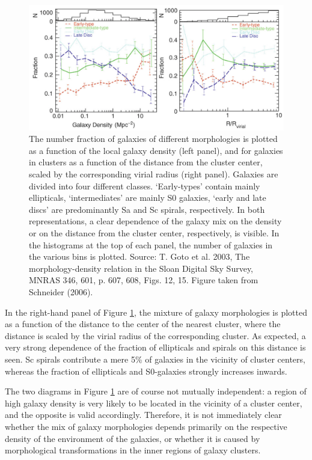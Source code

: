 \documentclass[a4paper,11pt]{article}
\begin{document}
\begin{figure}[t]
    \includegraphics[width=16cm]{figures/DensityMorphology.png}
    \centering
    \caption{\footnotesize{The number fraction of galaxies of different morphologies is plotted as a function of the local galaxy density (left panel), and for galaxies in clusters as a function of the distance from the cluster center, scaled by the corresponding virial radius (right panel). Galaxies are divided into four different classes. `Early-types' contain mainly ellipticals, `intermediates' are mainly S0 galaxies, `early and late discs' are predominantly Sa and Sc spirals, respectively. In both representations, a clear dependence of the galaxy mix on the density or on the distance from the cluster center, respectively, is visible. In the histograms at the top of each panel, the number of galaxies in the various bins is plotted. Source: T. Goto et al. 2003, The morphology-density relation in the Sloan Digital Sky Survey, MNRAS 346, 601, p. 607, 608, Figs. 12, 15. Figure taken from Schneider (2006).}}
    \label{fig:densitymorphology}
\end{figure}

{\noindent}In the right-hand panel of Figure \ref{fig:densitymorphology}, the mixture of galaxy morphologies is plotted as a function of the distance to the center of the nearest cluster, where the distance is scaled by the virial radius of the corresponding cluster. As expected, a very strong dependence of the fraction of ellipticals and spirals on this distance is seen. Sc spirals contribute a mere 5\% of galaxies in the vicinity of cluster centers, whereas the fraction of ellipticals and S0-galaxies strongly increases inwards.

{\noindent}The two diagrams in Figure \ref{fig:densitymorphology} are of course not mutually independent: a region of high galaxy density is very likely to be located in the vicinity of a cluster center, and the opposite is valid accordingly. Therefore, it is not immediately clear whether the mix of galaxy morphologies depends primarily on the respective density of the environment of the galaxies, or whether it is caused by morphological transformations in the inner regions of galaxy clusters.
\end{document}
